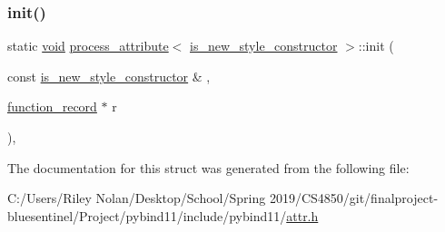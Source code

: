 \subsubsection{\texorpdfstring{init()}{init()}}
{\footnotesize\ttfamily static \mbox{\hyperlink{_s_d_l__opengles2__gl2ext_8h_ae5d8fa23ad07c48bb609509eae494c95}{void}} \mbox{\hyperlink{structprocess__attribute}{process\+\_\+attribute}}$<$ \mbox{\hyperlink{structis__new__style__constructor}{is\+\_\+new\+\_\+style\+\_\+constructor}} $>$\+::init (\begin{DoxyParamCaption}\item[{const \mbox{\hyperlink{structis__new__style__constructor}{is\+\_\+new\+\_\+style\+\_\+constructor}} \&}]{,  }\item[{\mbox{\hyperlink{structfunction__record}{function\+\_\+record}} $\ast$}]{r }\end{DoxyParamCaption})\hspace{0.3cm}{\ttfamily [inline]}, {\ttfamily [static]}}



The documentation for this struct was generated from the following file\+:\begin{DoxyCompactItemize}
\item 
C\+:/\+Users/\+Riley Nolan/\+Desktop/\+School/\+Spring 2019/\+C\+S4850/git/finalproject-\/bluesentinel/\+Project/pybind11/include/pybind11/\mbox{\hyperlink{attr_8h}{attr.\+h}}\end{DoxyCompactItemize}
